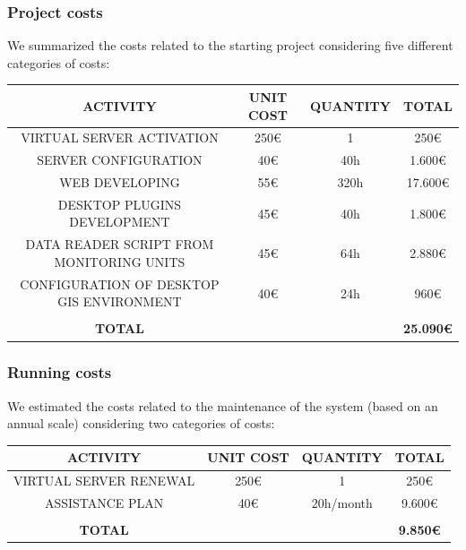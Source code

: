\subsubsection{Project costs}
We summarized the costs related to the starting project considering five different categories of costs:
\begin{table}[H]
    \begin{tabular}{|c|c|c|c|}
    \hline
    \textbf{ACTIVITY} & \textbf{UNIT COST} & \textbf{QUANTITY} & \textbf{TOTAL} \\ \hline
    VIRTUAL SERVER ACTIVATION & 250€ & 1 & 250€ \\ \hline
    SERVER CONFIGURATION & 40€ & 40h & 1.600€ \\ \hline
    WEB DEVELOPING & 55€ & 320h & 17.600€ \\ \hline
    DESKTOP PLUGINS DEVELOPMENT & 45€ & 40h & 1.800€ \\ \hline
    DATA READER SCRIPT FROM MONITORING UNITS & 45€ & 64h & 2.880€ \\ \hline
    CONFIGURATION OF DESKTOP GIS ENVIRONMENT & 40€ & 24h & 960€ \\ \hline
     &  &  &  \\ \hline
    \textbf{TOTAL} &  &  & \textbf{25.090€} \\ \hline
    \end{tabular}
\end{table}

\subsubsection{Running costs}
We estimated the costs related to the maintenance of the system (based on an annual scale) considering two categories of costs:
\begin{table}[H]
    \begin{tabular}{|c|c|c|c|}
    \hline
    \textbf{ACTIVITY} & \textbf{UNIT COST} & \textbf{QUANTITY} & \textbf{TOTAL} \\ \hline
    VIRTUAL SERVER RENEWAL & 250€ & 1 & 250€ \\ \hline
    ASSISTANCE PLAN & 40€ & 20h/month & 9.600€ \\ \hline
     &  &  &  \\ \hline
    \textbf{TOTAL} &  &  & \textbf{9.850€} \\ \hline
    \end{tabular}
\end{table}
